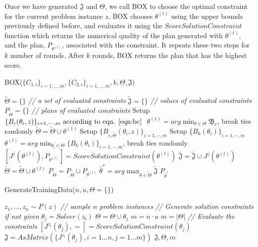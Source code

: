 Once we have generated $\mathfrak{J}$ and $\Theta$, we call BOX to choose 
the optimal constraint for the current problem instance $z$.
BOX chooses $\theta^{(t)}$ using the upper bounds previously defined before, 
and evaluates it using the $ScoreSolutionConstraint$ function
which returns the numerical quality of the plan generated with $\theta^{(t)}$,
and the plan, $P_{\theta^{(t)}}$, associated with the constraint. 
It repeats these two steps for $k$ number of rounds. After $k$ rounds,
BOX returns the plan that has the highest score.


\begin{algorithm}[tb]
\small
   \caption{BOX($ \{C_{1,i}\}_{i=1,\ldots,m},\{C_{2,i}\}_{i=1,\ldots,m}, k, \Theta, \mathfrak{J}$)}
   \label{alg:BOX}
\begin{algorithmic}
\STATE $\tilde{\Theta} = \{\}$ \emph{// a set of evaluated constraints}
\STATE $\tilde{\mathfrak{J}} = \{\}$ \emph{// values of evaluated constraints}
\STATE $P_{\tilde{\Theta}} = \{\}$ \emph{// plans of evaluated constraints}
\STATE Setup $ \{B_c(\theta_i,z)\}_{i=1,\cdots,m }\text{ according to eqn. \ref{eqn:bc} } $
\STATE $ \theta^{(1)} = arg\min_{ \theta \in \Theta} \mathfrak{B}_c $, break ties randomly
\STATE $\tilde{\Theta} =  \tilde{\Theta} \cup \theta^{(1)}$
  	\STATE Setup $\{B_{c,\tilde{\Theta}} (\theta_i,z)\}_{i=1,\cdots,m }$ 
	\STATE Setup $\{ B_k(\theta_i) \}_{i=1,\cdots,m}$ 
	\STATE $\theta^{(t)} =  arg\min_{ \theta_i \in \Theta}\{ B_k(\theta_i) \}_{i=1,\cdots,m}$, break ties randomly
	\STATE $[J^z(\theta^{(t)}),P_{\theta^{(t)}}] = ScoreSolutionConstraint(\theta^{(t)})$ 
	\STATE $\tilde{\mathfrak{J}} = \tilde{\mathfrak{J}} \cup J^z(\theta^{(t)})$
	\STATE $\tilde{\Theta} =  \tilde{\Theta} \cup \theta^{(t)}$	
	\STATE $P_{\tilde{\Theta}} =  P_{\tilde{\Theta}}  \cup P_{\theta^{(t)}}$	
  \ENDFOR
  \STATE $\hat{\theta}^* =  arg\max_{ \theta \in \tilde{\Theta} } \tilde{\mathfrak{J}}$
   $P_{\hat{\theta}^*}$
\end{algorithmic}
\end{algorithm}

\begin{algorithm}[tb]
\small
\caption{GenerateTrainingData($n,u,\Theta=\{\}$)}
\label{alg:GenTrainData}
\begin{algorithmic}
\STATE $z_1,\ldots, z_n \sim P(z)$  \emph{// sample $n$ problem  instances}
\STATE \emph{// Generate   solution constraints if not given}
\STATE $\theta_j = Solver(z_i)$
\STATE $\Theta = \Theta \cup \theta_j$
\ENDFOR
\STATE  $m = n\cdot u$
\ELSE 
\STATE $m = |\Theta|$
\ENDIF
\STATE \emph{// Evaluate the constraints}
\STATE $[J^{z_i}(\theta_j),\sim] = ScoreSolutionConstraint(\theta_j)$
\ENDFOR
\ENDFOR
\STATE $\mathfrak{J} = AsMatrix(\{J^{z_i}(\theta_j),i=1\ldots n,j=1\ldots m\}) $
  $\mathfrak{J},\Theta,m$
\end{algorithmic}
\end{algorithm}





